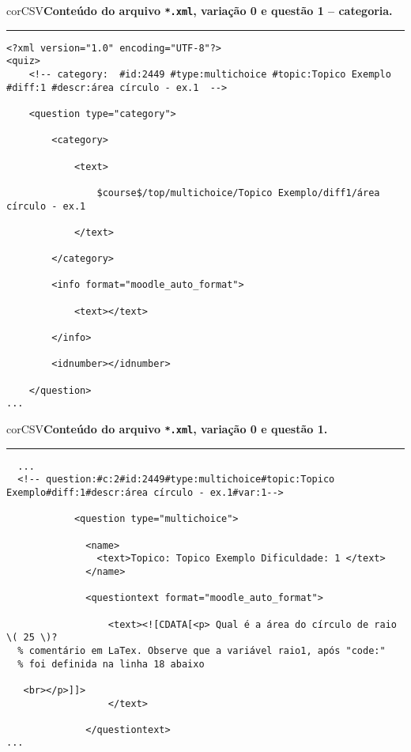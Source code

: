 
\begin{myboxCode}{corCSV}{\textbf{Conteúdo do arquivo \texttt{*.xml}, variação 0 e questão 1 -- categoria.}}\vspace{3mm}
\hrule
{\scriptsize
\begin{verbatim}
<?xml version="1.0" encoding="UTF-8"?>
<quiz>
    <!-- category:  #id:2449 #type:multichoice #topic:Topico Exemplo #diff:1 #descr:área círculo - ex.1  -->
    
    <question type="category">
    
        <category>
        
            <text>
            
                $course$/top/multichoice/Topico Exemplo/diff1/área círculo - ex.1
            
            </text>
            
        </category>
        
        <info format="moodle_auto_format">
        
            <text></text>
            
        </info>
        
        <idnumber></idnumber>
        
    </question>
...
\end{verbatim}
}
\end{myboxCode}



\begin{myboxCode}{corCSV}{\textbf{Conteúdo do arquivo \texttt{*.xml}, variação 0 e questão 1.}}\vspace{3mm}
  \hrule
  {\scriptsize
  \begin{verbatim}
  ...
  <!-- question:#c:2#id:2449#type:multichoice#topic:Topico Exemplo#diff:1#descr:área círculo - ex.1#var:1-->
  
            <question type="multichoice">
  
              <name>
                <text>Topico: Topico Exemplo Dificuldade: 1 </text>
              </name>
              
              <questiontext format="moodle_auto_format">
              
                  <text><![CDATA[<p> Qual é a área do círculo de raio \( 25 \)?
  % comentário em LaTex. Observe que a variável raio1, após "code:" 
  % foi definida na linha 18 abaixo
  
   <br></p>]]>
                  </text>
  
              </questiontext>
...
\end{verbatim}
}
\end{myboxCode}
            
